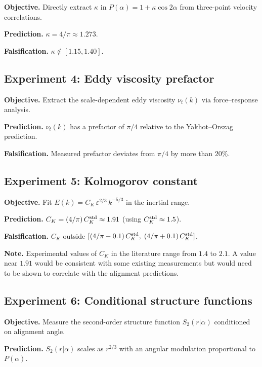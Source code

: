 \documentclass[12pt,a4paper]{article}
\begin{document}
\noindent\textbf{Objective.}
Directly extract $\kappa$ in $P(\alpha) = 1 + \kappa\cos 2\alpha$ from three-point velocity correlations.

\noindent\textbf{Prediction.}
$\kappa = 4/\pi \approx 1.273$.

\noindent\textbf{Falsification.}
$\kappa \notin [1.15, 1.40]$.

\subsection{Experiment 4: Eddy viscosity prefactor}

\noindent\textbf{Objective.}
Extract the scale-dependent eddy viscosity $\nu_t(k)$ via force--response analysis.

\noindent\textbf{Prediction.}
$\nu_t(k)$ has a prefactor of $\pi/4$ relative to the Yakhot--Orszag prediction.

\noindent\textbf{Falsification.}
Measured prefactor deviates from $\pi/4$ by more than $20\%$.

\subsection{Experiment 5: Kolmogorov constant}

\noindent\textbf{Objective.}
Fit $E(k) = C_K\,\varepsilon^{2/3}\,k^{-5/3}$ in the inertial range.

\noindent\textbf{Prediction.}
$C_K = (4/\pi)\,C_K^{\rm std} \approx 1.91$ (using $C_K^{\rm std} \approx 1.5$).

\noindent\textbf{Falsification.}
$C_K$ outside $[(4/\pi - 0.1)\,C_K^{\rm std},\;(4/\pi + 0.1)\,C_K^{\rm std}]$.

\noindent\textbf{Note.}
Experimental values of $C_K$ in the literature range from $1.4$ to $2.1$.
A value near $1.91$ would be consistent with some existing measurements but would need to be shown to correlate with the alignment predictions.

\subsection{Experiment 6: Conditional structure functions}

\noindent\textbf{Objective.}
Measure the second-order structure function $S_2(r|\alpha)$ conditioned on alignment angle.

\noindent\textbf{Prediction.}
$S_2(r|\alpha)$ scales as $r^{2/3}$ with an angular modulation proportional to $P(\alpha)$.
\end{document}
